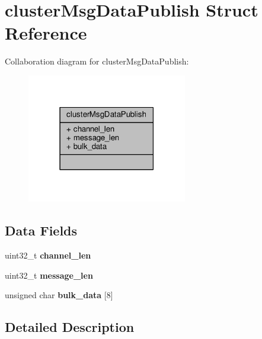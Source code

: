 \hypertarget{structclusterMsgDataPublish}{}\section{cluster\+Msg\+Data\+Publish Struct Reference}
\label{structclusterMsgDataPublish}


Collaboration diagram for cluster\+Msg\+Data\+Publish\+:\nopagebreak
\begin{figure}[H]
\begin{center}
\leavevmode
\includegraphics[width=198pt]{structclusterMsgDataPublish__coll__graph}
\end{center}
\end{figure}
\subsection*{Data Fields}
\begin{DoxyCompactItemize}
\item 
\mbox{\label{structclusterMsgDataPublish_a278c4b7d83c96df2d56b7997e35daad3}} 
uint32\+\_\+t {\bfseries channel\+\_\+len}
\item 
\mbox{\label{structclusterMsgDataPublish_a409a267a5fe003303c9380ed3ff2f2e5}} 
uint32\+\_\+t {\bfseries message\+\_\+len}
\item 
\mbox{\label{structclusterMsgDataPublish_a09627cf21fa82796a35abc80ab722afa}} 
unsigned char {\bfseries bulk\+\_\+data} \mbox{[}8\mbox{]}
\end{DoxyCompactItemize}


\subsection{Detailed Description}


